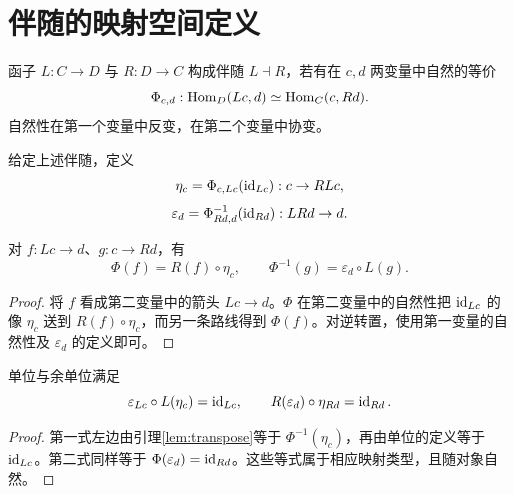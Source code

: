 \section{伴随的映射空间定义}
\begin{definition}[伴随]
函子 $L:C\to D$ 与 $R:D\to C$ 构成伴随 $L\dashv R$，若有在 $c,d$ 两变量中自然的等价
\[
\Phi_{c,d}:\operatorname{Hom}_D(Lc,d)\simeq\operatorname{Hom}_C(c,Rd).
\]
自然性在第一个变量中反变，在第二个变量中协变。
\end{definition}
\begin{definition}[单位与余单位]
给定上述伴随，定义
\[
\eta_c=\Phi_{c,Lc}(\operatorname{id}_{Lc}):c\to RLc,
\]
\[
\varepsilon_d=\Phi^{-1}_{Rd,d}(\operatorname{id}_{Rd}):LRd\to d.
\]
\end{definition}
\begin{lemma}[转置公式]\label{lem:transpose}
对 $f:Lc\to d$、$g:c\to Rd$，有
\[
\Phi(f)=R(f)\circ\eta_c,
\qquad
\Phi^{-1}(g)=\varepsilon_d\circ L(g).
\]
\end{lemma}
\begin{proof}
将 $f$ 看成第二变量中的箭头 $Lc\to d$。$\Phi$ 在第二变量中的自然性把 $\operatorname{id}_{Lc}$ 的像 $\eta_c$ 送到 $R(f)\circ\eta_c$，而另一条路线得到 $\Phi(f)$。对逆转置，使用第一变量的自然性及 $\varepsilon_d$ 的定义即可。
\end{proof}
\begin{proposition}[三角恒等式]
单位与余单位满足
\[
\varepsilon_{Lc}\circ L(\eta_c)=\operatorname{id}_{Lc},
\qquad
R(\varepsilon_d)\circ\eta_{Rd}=\operatorname{id}_{Rd}.
\]
\end{proposition}
\begin{proof}
第一式左边由引理\ref{lem:transpose}等于 $\Phi^{-1}(\eta_c)$，再由单位的定义等于 $\operatorname{id}_{Lc}$。第二式同样等于 $\Phi(\varepsilon_d)=\operatorname{id}_{Rd}$。这些等式属于相应映射类型，且随对象自然。
\end{proof}


